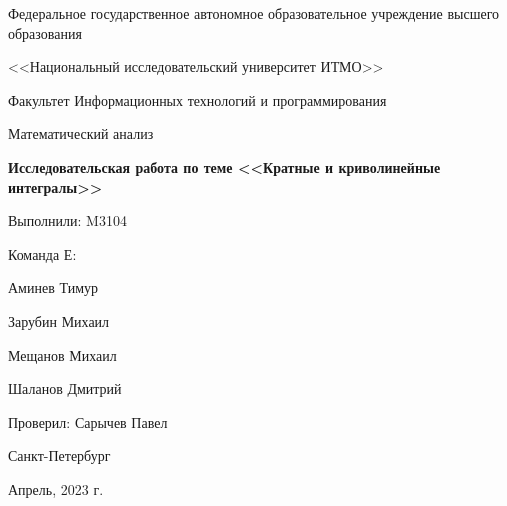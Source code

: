 \begin{titlepage}
  \begin{center}
    \Large
    Федеральное государственное автономное образовательное учреждение
    высшего образования

    <<Национальный исследовательский университет ИТМО>>

    \vspace{1cm}

    \Large
    Факультет Информационных технологий и программирования

    \vspace{1cm}
    Математический анализ

    \vspace{0.5cm}
    \LARGE
    \textbf{Исследовательская работа по теме
      <<Кратные и криволинейные интегралы>>
    }
  \end{center}

  \vspace{4cm}
  \vfill

  \begin{flushright}
    \Large
    Выполнили: M3104

    Команда Е:

    Аминев Тимур

    Зарубин Михаил

    Мещанов Михаил

    Шаланов Дмитрий


    Проверил: Сарычев Павел
  \end{flushright}

  \vfill

  \begin{center}
    \Large
    Санкт-Петербург

    Апрель, 2023 г.
  \end{center}
\end{titlepage}
